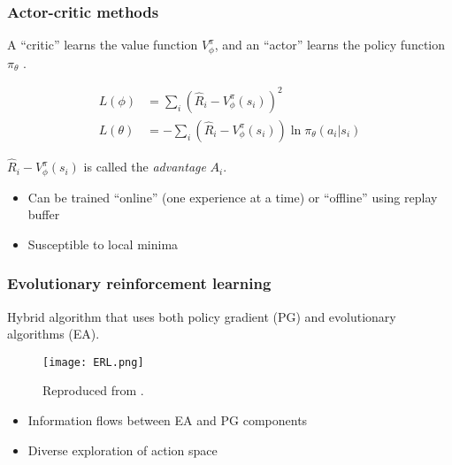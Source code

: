 \documentclass{beamer}
\begin{document}
\begin{frame}
\frametitle{Actor-critic methods}

A ``critic'' learns the value function $V^\pi_\phi$, and an ``actor'' learns the policy function $\pi_\theta$ \cite{sutton2018reinforcement}.

\begin{align}\label{eq:loss_fns}
    L(\phi) &= \sum_i (\hat{R}_i - V^\pi_\phi(s_i))^2 \\
    L(\theta) &= -\sum_i (\hat{R}_i - V^\pi_\phi(s_i))
        \ln \pi_\theta(a_i|s_i)
\end{align}

$\hat{R}_i - V^\pi_\phi(s_i)$ is called the \emph{advantage} $A_i$.

\pause

\begin{itemize}
    \item Can be trained ``online'' (one experience at a time) or ``offline'' using replay buffer
    \item Susceptible to local minima
\end{itemize}

\end{frame}

\begin{frame}
\frametitle{Evolutionary reinforcement learning}

Hybrid algorithm that uses both policy gradient (PG) and evolutionary algorithms (EA).

\begin{figure}
    \centering
    \texttt{[image: ERL.png]}
    \caption{Reproduced from \cite{khadka2018evolutionguided}.}
    \label{fig:ERL}
\end{figure}
\cite{khadka2018evolutionguided}

\begin{itemize}
    \item Information flows between EA and PG components
    \item Diverse exploration of action space
\end{itemize}

\end{frame}
\end{document}
